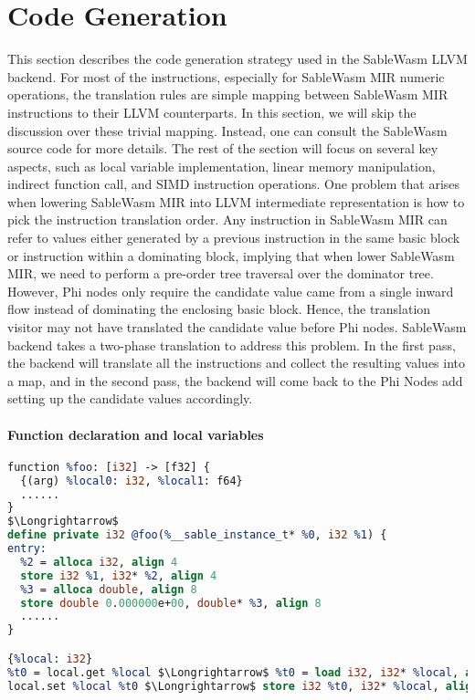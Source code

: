 \section{Code Generation}

This section describes the code generation strategy used in the SableWasm LLVM backend. For most of the instructions, especially for SableWasm MIR numeric operations, the translation rules are simple mapping between SableWasm MIR instructions to their LLVM counterparts. In this section, we will skip the discussion over these trivial mapping. Instead, one can consult the SableWasm source code for more details. The rest of the section will focus on several key aspects, such as local variable implementation, linear memory manipulation, indirect function call, and SIMD instruction operations. One problem that arises when lowering SableWasm MIR into LLVM intermediate representation is how to pick the instruction translation order. Any instruction in SableWasm MIR can refer to values either generated by a previous instruction in the same basic block or instruction within a dominating block, implying that when lower SableWasm MIR, we need to perform a pre-order tree traversal over the dominator tree. However, Phi nodes only require the candidate value came from a single inward flow instead of dominating the enclosing basic block. Hence, the translation visitor may not have translated the candidate value before Phi nodes. SableWasm backend takes a two-phase translation to address this problem. In the first pass, the backend will translate all the instructions and collect the resulting values into a map, and in the second pass, the backend will come back to the Phi Nodes add setting up the candidate values accordingly.

\paragraph{Function declaration and local variables} \quad
\begin{lstlisting}[basicstyle=\linespread{1}\small\ttfamily, language=LLVM, mathescape=true]
function %foo: [i32] -> [f32] {
  {(arg) %local0: i32, %local1: f64} 
  ......
}
$\Longrightarrow$
define private i32 @foo(%__sable_instance_t* %0, i32 %1) {
entry:
  %2 = alloca i32, align 4
  store i32 %1, i32* %2, align 4
  %3 = alloca double, align 8
  store double 0.000000e+00, double* %3, align 8
  ......
}

{%local: i32} 
%t0 = local.get %local $\Longrightarrow$ %t0 = load i32, i32* %local, align 4
local.set %local %t0 $\Longrightarrow$ store i32 %t0, i32* %local, align 4
\end{lstlisting}
